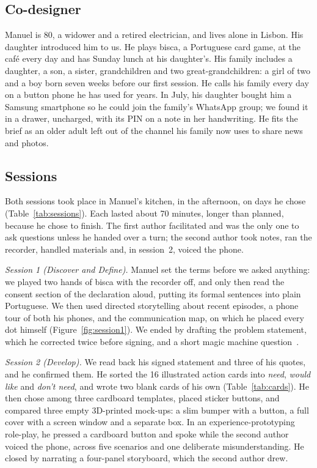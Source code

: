 \documentclass[acmtog,nonacm]{acmart}
\begin{document}
\subsection{Co-designer}
Manuel is 80, a widower and a retired electrician, and lives alone in Lisbon. His daughter introduced him to us. He plays bisca, a Portuguese card game, at the caf\'e every day and has Sunday lunch at his daughter's. His family includes a daughter, a son, a sister, grandchildren and two great-grandchildren: a girl of two and a boy born seven weeks before our first session. He calls his family every day on a button phone he has used for years. In July, his daughter bought him a Samsung smartphone so he could join the family's WhatsApp group; we found it in a drawer, uncharged, with its PIN on a note in her handwriting. He fits the brief as an older adult left out of the channel his family now uses to share news and photos.

\subsection{Sessions}
Both sessions took place in Manuel's kitchen, in the afternoon, on days he chose (Table~\ref{tab:sessions}). Each lasted about 70 minutes, longer than planned, because he chose to finish. The first author facilitated and was the only one to ask questions unless he handed over a turn; the second author took notes, ran the recorder, handled materials and, in session~2, voiced the phone.

\emph{Session 1 (Discover and Define).} Manuel set the terms before we asked anything: we played two hands of bisca with the recorder off, and only then read the consent section of the declaration aloud, putting its formal sentences into plain Portuguese. We then used directed storytelling about recent episodes, a phone tour of both his phones, and the communication map, on which he placed every dot himself (Figure~\ref{fig:session1}). We ended by drafting the problem statement, which he corrected twice before signing, and a short magic machine question~\cite{andersen2019magic}.

\emph{Session 2 (Develop).} We read back his signed statement and three of his quotes, and he confirmed them. He sorted the 16 illustrated action cards into \emph{need}, \emph{would like} and \emph{don't need}, and wrote two blank cards of his own (Table~\ref{tab:cards}). He then chose among three cardboard templates, placed sticker buttons, and compared three empty 3D-printed mock-ups: a slim bumper with a button, a full cover with a screen window and a separate box. In an experience-prototyping role-play, he pressed a cardboard button and spoke while the second author voiced the phone, across five scenarios and one deliberate misunderstanding. He closed by narrating a four-panel storyboard, which the second author drew.
\end{document}
